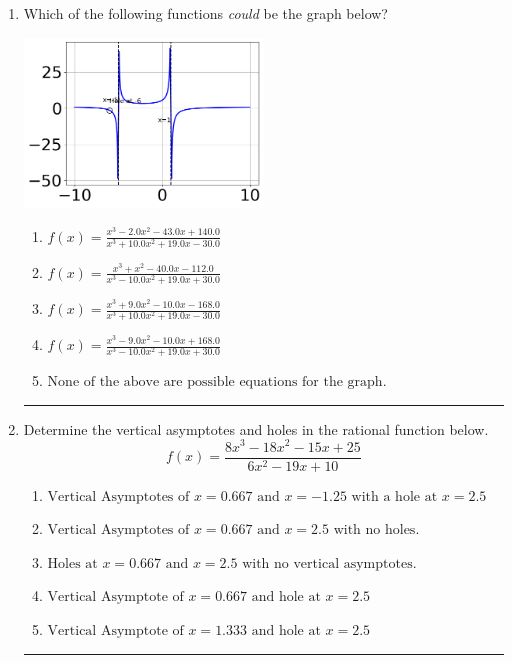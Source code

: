 \documentclass[14pt]{extbook}
\newcommand{\litem}[1]{\item#1\hspace*{-1cm}\rule{\textwidth}{0.4pt}}
\begin{document}
\begin{enumerate}
{\begin{enumerate}[label=\Alph*.]
\end{enumerate} }
\litem{
Which of the following functions \textit{could} be the graph below?
\begin{center}
    \includegraphics[width=0.5\textwidth]{../Figures/identifyGraphOfRationalFunctionC.png}
\end{center}
\begin{enumerate}[label=\Alph*.]
\item \( f(x)=\frac{x^{3} -2.0 x^{2} -43.0 x + 140.0}{x^{3} +10.0 x^{2} +19.0 x -30.0} \)
\item \( f(x)=\frac{x^{3} + x^{2} -40.0 x -112.0}{x^{3} -10.0 x^{2} +19.0 x + 30.0} \)
\item \( f(x)=\frac{x^{3} +9.0 x^{2} -10.0 x -168.0}{x^{3} +10.0 x^{2} +19.0 x -30.0} \)
\item \( f(x)=\frac{x^{3} -9.0 x^{2} -10.0 x + 168.0}{x^{3} -10.0 x^{2} +19.0 x + 30.0} \)
\item \( \text{None of the above are possible equations for the graph.} \)

\end{enumerate} }
\litem{
Determine the vertical asymptotes and holes in the rational function below.\[ f(x) = \frac{8x^{3} -18 x^{2} -15 x + 25}{6x^{2} -19 x + 10} \]\begin{enumerate}[label=\Alph*.]
\item \( \text{Vertical Asymptotes of } x = 0.667 \text{ and } x = -1.25 \text{ with a hole at } x = 2.5 \)
\item \( \text{Vertical Asymptotes of } x = 0.667 \text{ and } x = 2.5 \text{ with no holes.} \)
\item \( \text{Holes at } x = 0.667 \text{ and } x = 2.5 \text{ with no vertical asymptotes.} \)
\item \( \text{Vertical Asymptote of } x = 0.667 \text{ and hole at } x = 2.5 \)
\item \( \text{Vertical Asymptote of } x = 1.333 \text{ and hole at } x = 2.5 \)


\end{enumerate}}
\end{enumerate}
\end{document}
